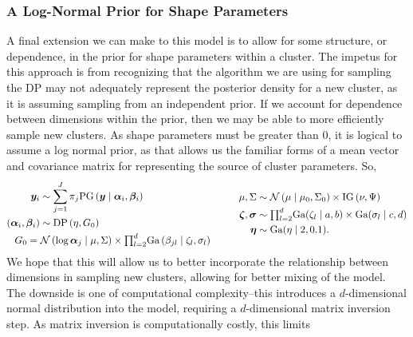 \subsubsection{A Log-Normal Prior for Shape Parameters}
A final extension we can make to this model is to allow for some structure, or dependence, in the prior
  for shape parameters within a cluster.  The impetus for this approach is from recognizing that the
  algorithm we are using for sampling the DP may not adequately represent the posterior density for
  a new cluster, as it is assuming sampling from an independent prior.  If we account for dependence
  between dimensions within the prior, then we may be able to more efficiently sample new clusters.
  As shape parameters must be greater than 0, it is logical to assume a log normal prior, as that
  allows us the familiar forms of a mean vector and covariance matrix for representing the source of
  cluster parameters. So,
  \begin{equation}
    \label{eqn:dpln}
    \begin{aligned}
      \bm{ y}_i &\sim \sum_{j = 1}^J\pi_j\text{PG}\left(\bm{ y}\mid \bm{ \alpha}_i, \bm{\beta}_i\right)\\
      (\bm{\alpha}_i, \bm{\beta}_i) &\sim \text{DP}\left(\eta, G_0\right)\\
        &~\hspace{-1cm}G_0 = \mathcal{N}\left(\log\bm{ \alpha}_{j}\mid\mu,\Sigma\right)\times
            {\textstyle\prod}_{l = 2}^d\text{Ga}\left(\beta_{jl}\mid\zeta_l,\sigma_l\right)
    \end{aligned}
    \hspace{1cm}
    \begin{aligned}
      \mu,\Sigma &\sim \mathcal{N}\left(\mu\mid\mu_0,\Sigma_0\right) \times \text{IG}\left(\nu,\Psi\right)\\
      \bm{ \zeta},\bm{\sigma} &\sim {\textstyle\prod}_{l = 2}^d\text{Ga}(\zeta_l \mid a,b) \times \text{Ga}(\sigma_l \mid c,d) \\
      \bm{ \eta} &\sim \text{Ga}(\eta \mid 2, 0.1).
    \end{aligned}
  \end{equation}
  We hope that this will allow us to better incorporate the relationship between dimensions in
  sampling new clusters, allowing for better mixing of the model.  The downside is one of computational
  complexity--this introduces a $d$-dimensional normal distribution into the model, requiring a
  $d$-dimensional matrix inversion step.  As matrix inversion is computationally costly, this limits

